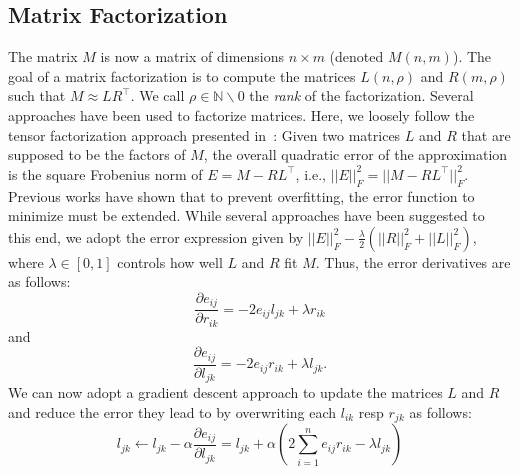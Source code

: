 \subsection{Matrix Factorization}
The matrix $M$ is now a matrix of dimensions $n \times m$ (denoted $M(n,m)$). 
The goal of a matrix factorization is to compute the matrices $L(n, \rho)$ and $R(m, \rho)$ such that $M \approx LR^{\top}$.
We call $\rho \in \mathbb{N} \backslash {0}$ the \emph{rank} of the factorization.
Several approaches have been used to factorize matrices.
Here, we loosely follow the tensor factorization approach presented in~\cite{DBLP:conf/www/NickelTK12}: Given two matrices $L$ and $R$ that are supposed to be the factors of $M$, the overall quadratic error of the approximation is the square Frobenius norm of $E = M - RL^{\top}$, i.e., $||E||_F^2 = ||M - RL^{\top}||_F^2$.
Previous works have shown that to prevent overfitting, the error function to minimize must be extended.
While several approaches have been suggested to this end, we adopt the error expression given by $||E||_F^2 - \frac{\lambda}{2}(||R||_F^2 + ||L||_F^2)$, where $\lambda \in [0, 1]$ controls how well $L$ and $R$ fit $M$. 
Thus, the error derivatives are as follows:
\begin{equation}
\frac{\partial e_{ij}}{\partial r_{ik}} = -2 e_{ij}l_{jk} + \lambda r_{ik}  
\end{equation}
 and 
\begin{equation}
\frac{\partial e_{ij}}{\partial l_{jk}} = -2 e_{ij}r_{ik} + \lambda l_{jk}.  
\end{equation}
We can now adopt a gradient descent approach to update the matrices $L$ and $R$ and reduce the error they lead to by overwriting each $l_{ik}$ resp $r_{jk}$ as follows:
\begin{equation}
l_{jk} \leftarrow l_{jk} - \alpha \frac{\partial e_{ij}}{\partial l_{jk}} = l_{jk} + \alpha \left(2 \sum\limits_{i=1}^n e_{ij}r_{ik} - \lambda l_{jk} \right)
\end{equation}
